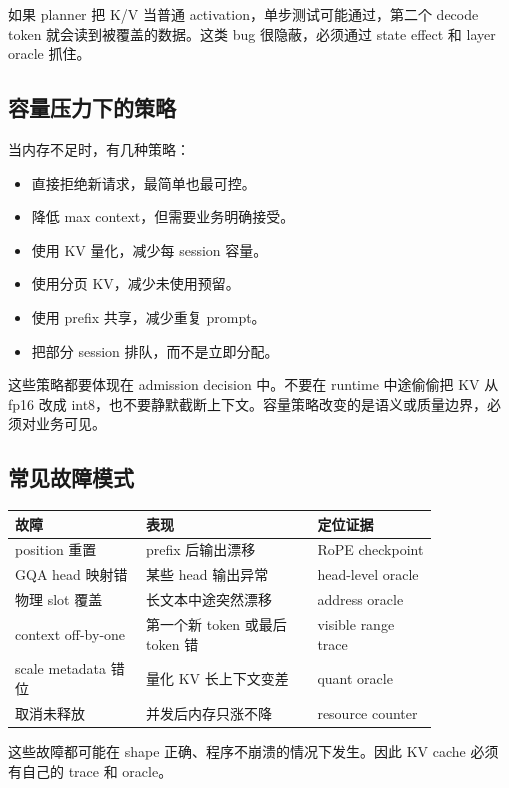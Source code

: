 如果 planner 把 K/V 当普通 activation，单步测试可能通过，第二个 decode token 就会读到被覆盖的数据。这类 bug 很隐蔽，必须通过 state effect 和 layer oracle 抓住。

\subsection{容量压力下的策略}

当内存不足时，有几种策略：

\begin{itemize}
  \item 直接拒绝新请求，最简单也最可控。
  \item 降低 max context，但需要业务明确接受。
  \item 使用 KV 量化，减少每 session 容量。
  \item 使用分页 KV，减少未使用预留。
  \item 使用 prefix 共享，减少重复 prompt。
  \item 把部分 session 排队，而不是立即分配。
\end{itemize}

这些策略都要体现在 admission decision 中。不要在 runtime 中途偷偷把 KV 从 fp16 改成 int8，也不要静默截断上下文。容量策略改变的是语义或质量边界，必须对业务可见。

\subsection{常见故障模式}

\begin{center}
\begin{tabular}{p{0.26\linewidth}p{0.34\linewidth}p{0.24\linewidth}}
\toprule
故障 & 表现 & 定位证据 \\
\midrule
position 重置 & prefix 后输出漂移 & RoPE checkpoint \\
GQA head 映射错 & 某些 head 输出异常 & head-level oracle \\
物理 slot 覆盖 & 长文本中途突然漂移 & address oracle \\
context off-by-one & 第一个新 token 或最后 token 错 & visible range trace \\
scale metadata 错位 & 量化 KV 长上下文变差 & quant oracle \\
取消未释放 & 并发后内存只涨不降 & resource counter \\
\bottomrule
\end{tabular}
\end{center}

这些故障都可能在 shape 正确、程序不崩溃的情况下发生。因此 KV cache 必须有自己的 trace 和 oracle。

